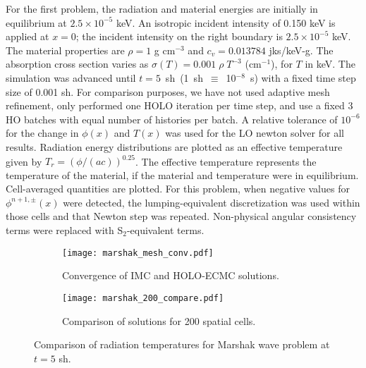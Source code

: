 For the first problem, the radiation and material energies are initially in
equilibrium at $2.5\times 10^{-5}$ keV.   An isotropic incident intensity of 0.150 keV is applied
at $x=0$; the incident intensity on the right boundary is $2.5\times10^{-5}$ keV.
The material properties are $\rho = 1$ g cm$^{-3}$ and $c_v = 0.013784$ jks/keV-g. The
absorption cross section varies as $\sigma(T) = 0.001\;\rho\; T^{-3}$ (cm$^{-1}$), for $T$
in keV.
The simulation was advanced until $t=5$~sh~(1~sh~$\equiv$~10$^{-8}$~s) with a fixed time step size of 0.001 sh. For comparison purposes, we
have not used adaptive mesh
refinement, only performed one HOLO iteration per time
step, and use a fixed 3 HO batches with equal number of histories per batch. A
relative tolerance of $10^{-6}$ for the change in $\phi(x)$ and $T(x)$ was used for
the LO newton solver for all results. Radiation energy
distributions are plotted as an effective temperature given by
$T_r=(\phi/(ac))^{0.25}$.  The effective temperature represents the temperature of the
material, if the material and temperature were in equilibrium.  Cell-averaged quantities are plotted.
For this problem, when negative values for $\phi^{n+1,\pm}(x)$ were detected, the lumping-equivalent
discretization was used within those cells and that Newton step was repeated.
Non-physical angular consistency terms were replaced with S$_2$-equivalent terms.
\begin{figure}[hp]
    \centering
\begin{subfigure}{0.7\textwidth}
  \centering
    \texttt{[image: marshak\_mesh\_conv.pdf]}
    \caption{\label{marshak_mesh_conv} Convergence of IMC and HOLO-ECMC solutions.}
\end{subfigure}
\begin{subfigure}{0.7\textwidth}
  \centering
  \texttt{[image: marshak\_200\_compare.pdf]}
  \caption{\label{marshak_200_compare}  Comparison of solutions for 200 spatial cells. }
\end{subfigure}
\caption{Comparison of radiation temperatures for Marshak wave problem at ${t=5}$ sh.}
\end{figure}

